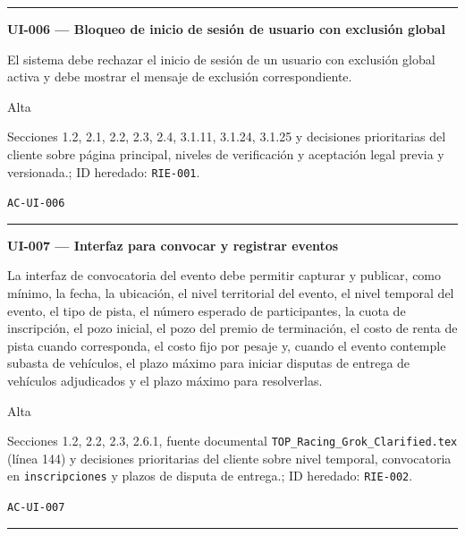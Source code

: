 \documentclass[10pt,letterpaper]{article}
\begin{document}
\vspace{0.25em}\hrule\vspace{0.65em}
\noindent\textbf{UI-006 --- Bloqueo de inicio de sesión de usuario con exclusión global}\par
\begin{description}[style=nextline,leftmargin=3.15cm,labelwidth=2.8cm,font=\normalfont\bfseries]
\item[Obligación] El sistema debe rechazar el inicio de sesión de un usuario con exclusión global activa y debe mostrar el mensaje de exclusión correspondiente.
\item[Prioridad] Alta
\item[Procedencia] Secciones 1.2, 2.1, 2.2, 2.3, 2.4, 3.1.11, 3.1.24, 3.1.25 y decisiones prioritarias del cliente sobre página principal, niveles de verificación y aceptación legal previa y versionada.; ID heredado: \texttt{RIE-001}.
\item[Verificación] \texttt{AC-UI-006}
\end{description}
\vspace{0.25em}\hrule\vspace{0.65em}
\noindent\textbf{UI-007 --- Interfaz para convocar y registrar eventos}\par
\begin{description}[style=nextline,leftmargin=3.15cm,labelwidth=2.8cm,font=\normalfont\bfseries]
\item[Obligación] La interfaz de convocatoria del evento debe permitir capturar y publicar, como mínimo, la fecha, la ubicación, el nivel territorial del evento, el nivel temporal del evento, el tipo de pista, el número esperado de participantes, la cuota de inscripción, el pozo inicial, el pozo del premio de terminación, el costo de renta de pista cuando corresponda, el costo fijo por pesaje y, cuando el evento contemple subasta de vehículos, el plazo máximo para iniciar disputas de entrega de vehículos adjudicados y el plazo máximo para resolverlas.
\item[Prioridad] Alta
\item[Procedencia] Secciones 1.2, 2.2, 2.3, 2.6.1, fuente documental \texttt{TOP\_Racing\_Grok\_Clarified.tex} (línea 144) y decisiones prioritarias del cliente sobre nivel temporal, convocatoria en \texttt{inscripciones} y plazos de disputa de entrega.; ID heredado: \texttt{RIE-002}.
\item[Verificación] \texttt{AC-UI-007}
\end{description}
\vspace{0.25em}\hrule\vspace{0.65em}
\end{document}
